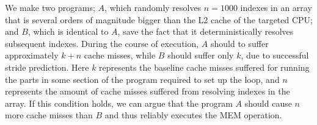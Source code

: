 We make two programs; \(A\), which randomly resolves \(n = 1000\) indexes in an array that is several orders of magnitude bigger than the L2 cache of the targeted CPU; and \(B\), which is identical to \(A\), save the fact that it deterministically resolves subsequent indexes.
During the course of execution, \(A\) should to suffer approximately \(k+n\) cache misses, while \(B\) should suffer only \(k\), due to successful stride prediction.
Here \(k\) represents the baseline cache misses suffered for running the parts in some section of the program required to set up the loop, and \(n\) represents the amount of cache misses suffered from resolving indexes in the array.
If this condition holds, we can argue that the program \(A\) should cause \(n\) more cache misses than \(B\) and thus reliably executes the MEM operation. 

